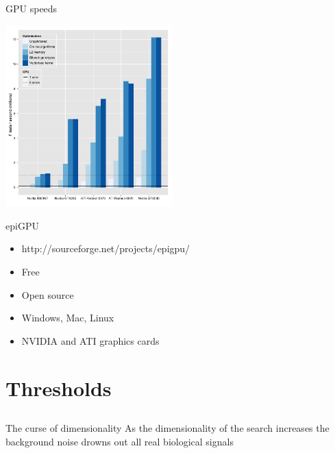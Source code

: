 \documentclass{beamer}
\begin{document}
\begin{frame}{GPU speeds}
	\begin{center}
		\includegraphics[height=7cm]{gpuoptimisation.pdf}
	\end{center}
\end{frame}

\begin{frame}{epiGPU}
	\begin{itemize}
		\item http://sourceforge.net/projects/epigpu/
		\item Free
		\item Open source
		\item Windows, Mac, Linux
		\item NVIDIA and ATI graphics cards
	\end{itemize}
\end{frame}



\section{Thresholds}
\subsection{}

\begin{frame}{The curse of dimensionality}
As the dimensionality of the search increases the background noise drowns out all real biological signals
\end{frame}
\end{document}
